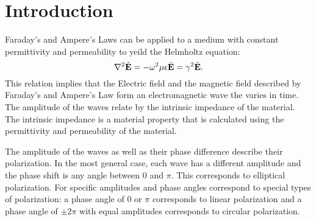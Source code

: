 \section{Introduction}\label{sec:intro}
Faraday's and Ampere's Laws can be applied \cite[pp. 15-16]{lab-manual} to a medium with constant permittivity and permeability to yeild the Helmholtz equation:
\begin{equation}
	\nabla^2 \tilde{\mathbf{E}} = - \omega^2 \mu \epsilon \tilde{\mathbf{E}} = \gamma^2 \tilde{\mathbf{E}}.
\end{equation}
This relation implies that the Electric field and the magnetic field described by Faraday's and Ampere's Law form an electromagnetic wave the varies in time. The amplitude of the waves relate by the intrinsic impedance of the material. The intrinsic impedance is a material property that is calculated using the permittivity and permeability of the material. 

The amplitude of the waves as well as their phase difference describe their polarization. In the most general case, each wave has a different amplitude and the phase shift is any angle between 0 and $\pi$. This corresponds to elliptical polarization. For specific amplitudes and phase angles correspond to special types of polarization: a phase angle of 0 or $\pi$ corresponds to linear polarization and a phase angle of $\pm 2\pi$ with equal amplitudes corresponds to circular polarization. 